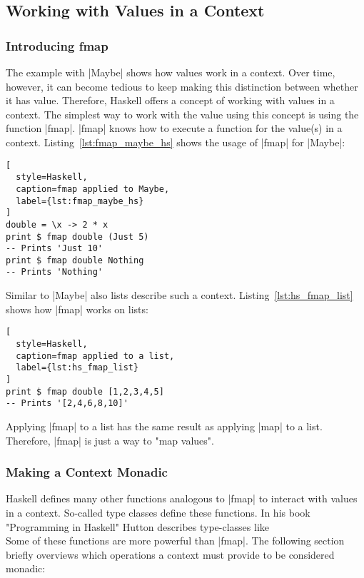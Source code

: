 \subsection{Working with Values in a Context} %
\label{sub:Working with values in a context}
\subsubsection{Introducing fmap} %
\label{subsub:Introducing fmap}
The example with |Maybe| shows how values work in a context. Over time,
however, it can become tedious to keep making this distinction between whether
it has value. Therefore, Haskell offers a concept of working with values in a
context. The simplest way to work with the value using this concept is using
the function |fmap|. |fmap| knows how to execute a function for the value(s) in
a context. Listing~\ref{lst:fmap_maybe_hs} shows the usage of |fmap| for
|Maybe|:

\begin{lstlisting}[
  style=Haskell,
  caption=fmap applied to Maybe,
  label={lst:fmap_maybe_hs}
]
double = \x -> 2 * x
print $ fmap double (Just 5)
-- Prints 'Just 10' 
print $ fmap double Nothing
-- Prints 'Nothing'
\end{lstlisting}

Similar to |Maybe| also lists describe such a context.
Listing~\ref{lst:hs_fmap_list} shows how |fmap| works on lists:

\begin{lstlisting}[
  style=Haskell,
  caption=fmap applied to a list,
  label={lst:hs_fmap_list}
]
print $ fmap double [1,2,3,4,5]
-- Prints '[2,4,6,8,10]'
\end{lstlisting}

Applying |fmap| to a list has the same result as applying |map| to a list.
Therefore, |fmap| is just a way to "map values".

\subsubsection{Making a Context Monadic} %
\label{sec:Making a Context Monadic}
Haskell defines many other functions analogous to |fmap| to interact with
values in a context. So-called type classes define these functions. In his book
"Programming in Haskell" Hutton describes type-classes like
\\ 
Some of these functions are more powerful than |fmap|. The following section
briefly overviews which operations a context must provide to be considered
monadic:

